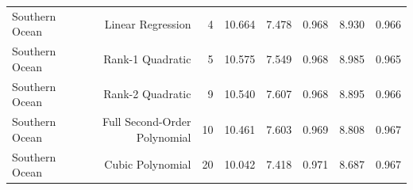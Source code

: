 \begin{table}
{\begin{tabular}{lrrrrrrr}
Southern Ocean & Linear Regression & 4 & 10.664 & 7.478 & 0.968 & 8.930 & 0.966 \\
Southern Ocean & Rank-1 Quadratic & 5 & 10.575 & 7.549 & 0.968 & 8.985 & 0.965 \\
Southern Ocean & Rank-2 Quadratic & 9 & 10.540 & 7.607 & 0.968 & 8.895 & 0.966 \\
Southern Ocean & Full Second-Order Polynomial & 10 & 10.461 & 7.603 & 0.969 & 8.808 & 0.967 \\
Southern Ocean & Cubic Polynomial & 20 & 10.042 & 7.418 & 0.971 & 8.687 & 0.967 \\
\bottomrule
\end{tabular}%
}
\end{table}

